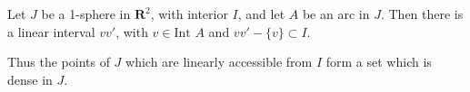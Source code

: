 Let $J$ be a 1-sphere in $\mathbf{R}^2$, with interior $I$, and let $A$ be an arc in $J$. Then there is a linear interval $vv'$, with $v \in \text{Int } A$ and $vv' - \{v\} \subset I$.

Thus the points of $J$ which are linearly accessible from $I$ form a set which is dense in $J$.
